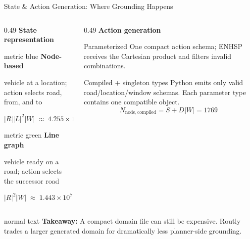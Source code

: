 \documentclass[10pt,aspectratio=169]{beamer}
\newcommand{\takeaway}[1]{%
  \begin{beamercolorbox}[rounded=true,sep=0.65ex,wd=\linewidth]{normal text}%
    \textbf{Takeaway:} #1
  \end{beamercolorbox}%
}
\newcommand{\metric}[3]{%
  \begin{beamercolorbox}[rounded=true,sep=0.75ex,wd=\linewidth]{#1}%
    {\Large\bfseries #2}\par
    {\scriptsize #3}
  \end{beamercolorbox}%
}
\begin{document}
\begin{frame}{State \& Action Generation: Where Grounding Happens}
  \begin{columns}[T,onlytextwidth]
    \begin{column}{0.49\textwidth}
      \textbf{State representation}

      \vspace{0.20cm}
      \metric{metric blue}{Node-based}{vehicle at a location; action selects road, from, and to}
      \vspace{0.15cm}
      \centering
      $|R||L|^2|W|\;\approx\;4.255\times10^9$

      \vspace{0.28cm}
      \metric{metric green}{Line graph}{vehicle ready on a road; action selects the successor road}
      \vspace{0.15cm}
      \centering
      $|R|^2|W|\;\approx\;1.443\times10^7$
    \end{column}
    \begin{column}{0.49\textwidth}
      \textbf{Action generation}

      \vspace{0.20cm}
      \begin{beamerboxesrounded}[upper=block title,lower=block body,shadow=true]{Parameterized}
        \scriptsize One compact action schema; ENHSP receives the Cartesian product and filters invalid combinations.
      \end{beamerboxesrounded}

      \vspace{0.22cm}
      \begin{beamerboxesrounded}[upper=block title,lower=block body,shadow=true]{Compiled + singleton types}
        \scriptsize Python emits only valid road/location/window schemas. Each parameter type contains one compatible object.
        \[
          N_{\mathrm{node,compiled}}=S+D|W|=1769
        \]
      \end{beamerboxesrounded}
    \end{column}
  \end{columns}

  \vspace{0.32cm}
  \takeaway{A compact domain file can still be expensive. Routly trades a larger generated domain for dramatically less planner-side grounding.}
\end{frame}
\end{document}
